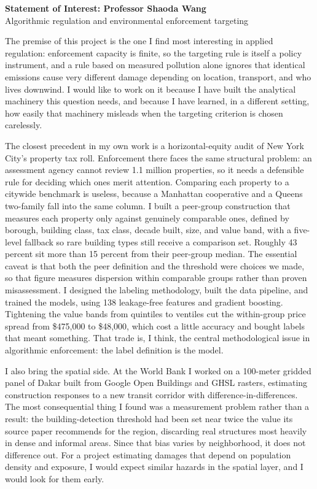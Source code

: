 

\begin{center}{\bfseries\large Statement of Interest: Professor Shaoda Wang}\\[2pt]
{\small Algorithmic regulation and environmental enforcement targeting}\end{center}
\vspace{6pt}

The premise of this project is the one I find most interesting in applied regulation: enforcement capacity is finite, so the targeting rule is itself a policy instrument, and a rule based on measured pollution alone ignores that identical emissions cause very different damage depending on location, transport, and who lives downwind. I would like to work on it because I have built the analytical machinery this question needs, and because I have learned, in a different setting, how easily that machinery misleads when the targeting criterion is chosen carelessly.

The closest precedent in my own work is a horizontal-equity audit of New York City's property tax roll. Enforcement there faces the same structural problem: an assessment agency cannot review 1.1 million properties, so it needs a defensible rule for deciding which ones merit attention. Comparing each property to a citywide benchmark is useless, because a Manhattan cooperative and a Queens two-family fall into the same column. I built a peer-group construction that measures each property only against genuinely comparable ones, defined by borough, building class, tax class, decade built, size, and value band, with a five-level fallback so rare building types still receive a comparison set. Roughly 43 percent sit more than 15 percent from their peer-group median. The essential caveat is that both the peer definition and the threshold were choices we made, so that figure measures dispersion within comparable groups rather than proven misassessment. I designed the labeling methodology, built the data pipeline, and trained the models, using 138 leakage-free features and gradient boosting. Tightening the value bands from quintiles to ventiles cut the within-group price spread from \$475,000 to \$48,000, which cost a little accuracy and bought labels that meant something. That trade is, I think, the central methodological issue in algorithmic enforcement: the label definition is the model.

I also bring the spatial side. At the World Bank I worked on a 100-meter gridded panel of Dakar built from Google Open Buildings and GHSL rasters, estimating construction responses to a new transit corridor with difference-in-differences. The most consequential thing I found was a measurement problem rather than a result: the building-detection threshold had been set near twice the value its source paper recommends for the region, discarding real structures most heavily in dense and informal areas. Since that bias varies by neighborhood, it does not difference out. For a project estimating damages that depend on population density and exposure, I would expect similar hazards in the spatial layer, and I would look for them early.

